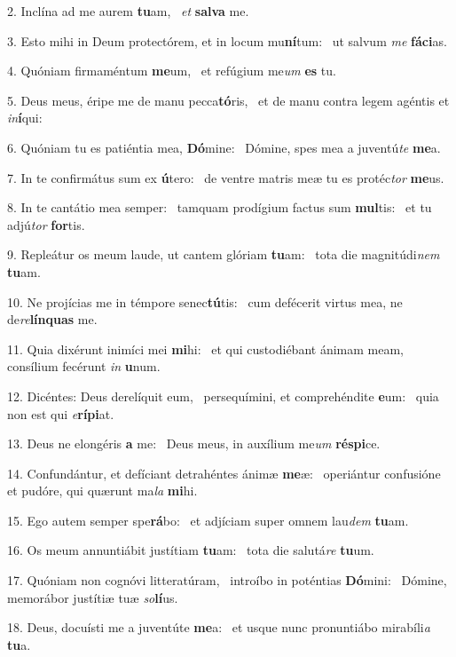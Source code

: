 2. Inclína ad me aurem \textbf{tu}am, \ast\  \textit{et} \textbf{sal}\textbf{va} me.\

3. Esto mihi in Deum protectórem, et in locum mu\textbf{ní}tum: \ast\  ut salvum \textit{me} \textbf{fá}\textbf{ci}as.\

4. Quóniam firmaméntum \textbf{me}um, \ast\  et refúgium me\textit{um} \textbf{es} tu.\

5. Deus meus, éripe me de manu pecca\textbf{tó}ris, \ast\  et de manu contra legem agéntis et \textit{in}\textbf{í}qui:\

6. Quóniam tu es patiéntia mea, \textbf{Dó}mine: \ast\  Dómine, spes mea a juventú\textit{te} \textbf{me}a.\

7. In te confirmátus sum ex \textbf{ú}tero: \ast\  de ventre matris meæ tu es protéc\textit{tor} \textbf{me}us.\

8. In te cantátio mea semper: \dag\  tamquam prodígium factus sum \textbf{mul}tis: \ast\  et tu adjú\textit{tor} \textbf{for}tis.\

9. Repleátur os meum laude, ut cantem glóriam \textbf{tu}am: \ast\  tota die magnitúdi\textit{nem} \textbf{tu}am.\

10. Ne projícias me in témpore senec\textbf{tú}tis: \ast\  cum defécerit virtus mea, ne de\textit{re}\textbf{lín}\textbf{quas} me.\

11. Quia dixérunt inimíci mei \textbf{mi}hi: \ast\  et qui custodiébant ánimam meam, consílium fecérunt \textit{in} \textbf{u}num.\

12. Dicéntes: Deus derelíquit eum, \dag\  persequímini, et comprehéndite \textbf{e}um: \ast\  quia non est qui \textit{e}\textbf{rí}\textbf{pi}at.\

13. Deus ne elongéris \textbf{a} me: \ast\  Deus meus, in auxílium me\textit{um} \textbf{ré}\textbf{spi}ce.\

14. Confundántur, et defíciant detrahéntes ánimæ \textbf{me}æ: \ast\  operiántur confusióne et pudóre, qui quærunt ma\textit{la} \textbf{mi}hi.\

15. Ego autem semper spe\textbf{rá}bo: \ast\  et adjíciam super omnem lau\textit{dem} \textbf{tu}am.\

16. Os meum annuntiábit justítiam \textbf{tu}am: \ast\  tota die salutá\textit{re} \textbf{tu}um.\

17. Quóniam non cognóvi litteratúram, \dag\  introíbo in poténtias \textbf{Dó}mini: \ast\  Dómine, memorábor justítiæ tuæ \textit{so}\textbf{lí}us.\

18. Deus, docuísti me a juventúte \textbf{me}a: \ast\  et usque nunc pronuntiábo mirabíli\textit{a} \textbf{tu}a.\

